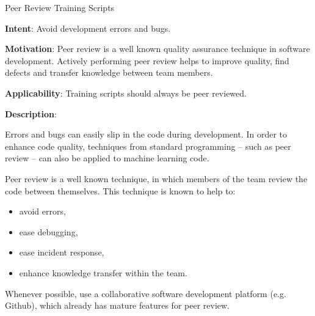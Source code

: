   
  \begin{frame}[plain]{ Peer Review Training Scripts
 }

  \textbf{Intent}: Avoid development errors and bugs.  
 

  \textbf{Motivation}: Peer review is a well known quality assurance technique in software development. Actively performing peer review helps to improve quality, find defects and transfer knowledge between team members. 
 

  \textbf{Applicability}: Training scripts should always be peer reviewed.
 

  \textbf{Description}: 

Errors and bugs can easily slip in the code during development.
In order to enhance code quality, techniques from standard programming -- such as peer review -- can also be applied to machine learning code.


Peer review is a well known technique, in which members of the team review the code between themselves.
This technique is known to help to:


\begin{itemize}

  \item avoid errors,

  \item ease debugging,

  \item ease incident response,

  \item enhance knowledge transfer within the team.

\end{itemize}


Whenever possible, use a collaborative software development platform (e.g. Github), which already has mature features for peer review.


 


  \end{frame}


